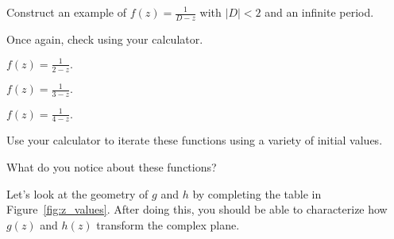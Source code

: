 \documentclass[../key.tex]{subfiles}
\begin{document}
\begin{inner_problem}
\item Construct an example of $f(z)=\frac{1}{D-z}$ with $|D|<2$ and an infinite period.
\end{inner_problem}

\begin{inner_problem}
\item Once again, check using your calculator.
\end{inner_problem}

\begin{outer_problem}
\item
\end{outer_problem}


\begin{iinner_problem}[start=1]
\item $f(z)=\frac{1}{2-z}.$
\end{iinner_problem}

\begin{iinner_problem}
\item $f(z)=\frac{1}{3-z}.$
\end{iinner_problem}

\begin{iinner_problem}
\item $f(z)=\frac{1}{4-z}.$
\end{iinner_problem}

\begin{inner_problem}
\item Use your calculator to iterate these functions using a variety of initial values.
\end{inner_problem}

\begin{inner_problem}
\item What do you notice about these functions?
\end{inner_problem}

\begin{outer_problem}
\item Let's look at the geometry of $g$ and $h$ by completing the table in Figure~\ref{fig:z_values}. After doing this, you should be able to characterize how $g(z)$ and $h(z)$ transform the complex plane.
\end{outer_problem}
\end{document}
